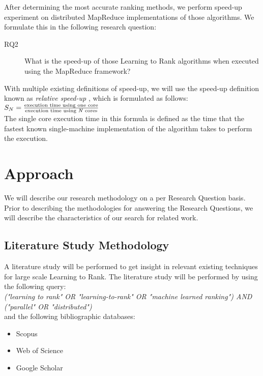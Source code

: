 After determining the most accurate ranking methods, we perform speed-up experiment on distributed MapReduce implementations of those algorithms. We formulate this in the following research question: \\

\begin{description}
\item[RQ2] What is the speed-up of those Learning to Rank algorithms when executed using the MapReduce framework?
\end{description}
\bigskip
With multiple existing definitions of speed-up, we will use the speed-up definition known as \emph{relative speed-up} \cite{Sun1991}, which is formulated as follows:\\

$S_N = \frac{\text{execution time using one core}}{\text{execution time using \emph{N} cores}}$\\

The single core execution time in this formula is defined as the time that the fastest known single-machine implementation of the algorithm takes to perform the execution.

\section{Approach}
We will describe our research methodology on a per Research Question basis. Prior to describing the methodologies for answering the Research Questions, we will describe the characteristics of our search for related work.

\subsection{Literature Study Methodology}
A literature study will be performed to get insight in relevant existing techniques for large scale Learning to Rank. The literature study will be performed by using the following query:\\

\emph{("learning to rank" \emph{OR} "learning-to-rank" \emph{OR} "machine learned ranking") \emph{AND} ("parallel" \emph{OR} "distributed")}\\

and the following bibliographic databases:
\begin{itemize}
\item Scopus
\item Web of Science
\item Google Scholar
\end{itemize}

